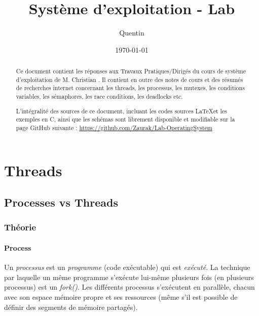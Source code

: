 \documentclass[a4paper, 12pt]{article}
\begin{document}
 
\title{Système d'exploitation - Lab}
\author{Quentin }

\date{\today} 
 
\maketitle
\vfill
\begin{abstract}
	Ce document contient les réponses aux Travaux Pratiques/Dirigés du cours de système d'exploitation de M. Christian . Il contient en outre des notes de cours et des résumés de recherches internet concernant les threads, les processus, les mutexes, les conditions variables, les sémaphores, les race conditions, les deadlocks etc.
	\newline
	
	L'intégralité des sources de ce document, incluant les codes sources \LaTeX et les exemples en C, ainsi que les schémas sont librement disponible et modifiable sur la page GitHub suivante :	
	\url{https://github.com/Zaurak/Lab-OperatingSystem}
\end{abstract}
\vfill
\newpage

\tableofcontents
\newpage


\section{Threads}

\subsection{Processes vs Threads}

\subsubsection{Théorie}

\paragraph{Process\\}
Un \emph{processus} est un \emph{programme} (code exécutable) qui est \emph{exécuté}. La technique par laquelle un même programme s'exécute lui-même plusieurs fois (en plusieurs processus) est un \emph{fork()}. Les différents processus s'exécutent en parallèle, chacun avec son espace mémoire propre et ses ressources (même s'il est possible de définir des segments de mémoire partagés).
\end{document}

